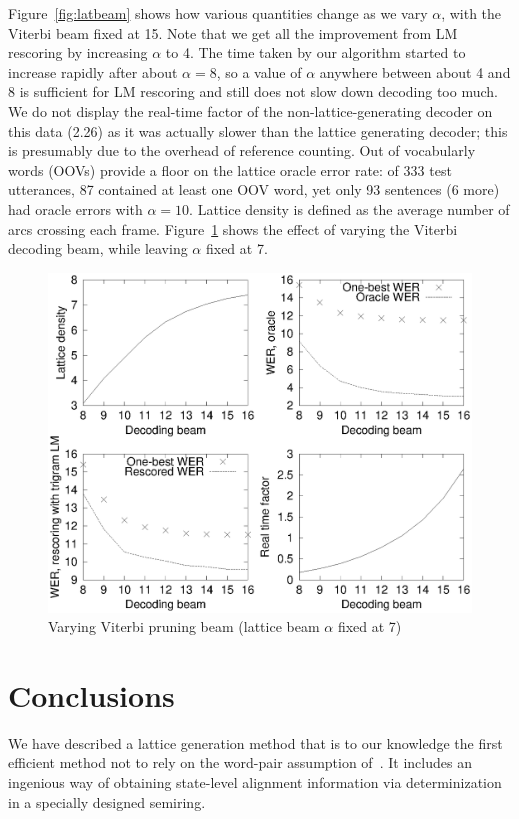 \documentclass{article}
\begin{document}
Figure~\ref{fig:latbeam} shows how various quantities change as we vary
$\alpha$, with the Viterbi beam fixed at 15.  Note that we get all the improvement from
LM rescoring by increasing $\alpha$ to 4.  The time taken by our algorithm started to increase rapidly after about
$\alpha=8$, so a value of $\alpha$ anywhere between about 4 and 8 is sufficient for LM rescoring 
and still does not slow down decoding too much.  We do not display the real-time factor of the non-lattice-generating
decoder on this data (2.26) as it was actually slower than the lattice generating decoder; this is
presumably due to the overhead of reference counting.
Out of vocabularly words (OOVs) provide a floor on the lattice oracle error rate:
of 333 test utterances, 87 contained at least one OOV word, yet only 93 sentences (6 more) had oracle errors
with $\alpha=10$.  Lattice density is defined as the average number of arcs crossing each frame.
Figure~\ref{fig:viterbibeam} shows the effect of varying the
Viterbi decoding beam, while leaving $\alpha$ fixed at 7.  

\begin{figure}
\centering
   \includegraphics[width=0.9\columnwidth]{figures/decodebeam.eps} 
 \vspace*{-0.1in}
    \caption{\vspace*{-0.2in} Varying Viterbi pruning beam (lattice beam $\alpha$ fixed at 7) }
  \label{fig:viterbibeam}
  \vspace{-0.08in}
\end{figure}


\section{Conclusions}
\label{sec:conc}

We have described a lattice generation method that is to our knowledge the first
efficient method not to rely on the word-pair assumption of~\cite{ney_word_graph}.
It includes an ingenious way of obtaining state-level alignment information
via determinization in a specially designed semiring. 




\end{document}
